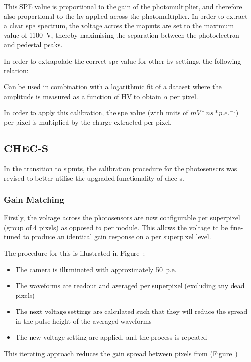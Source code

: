 
This SPE value is proportional to the gain of the photomultiplier, and therefore also proportional to the \gls{hv} applied across the photomultiplier. In order to extract a clear \gls{spe} spectrum, the voltage across the \glspl{mapmt} are set to the maximum value of 1100~V, thereby maximising the separation between the photoelectron and pedestal peaks.

In order to extrapolate the correct \gls{spe} value for other \gls{hv} settings, the following relation:

Can be used in combination with a logarithmic  fit of a dataset where the amplitude is measured as a function of HV to obtain $\alpha$ per pixel. 


In order to apply this calibration, the \gls{spe} value (with units of $mV*ns*p.e.^{-1}$) per pixel is multiplied by the charge extracted per pixel. 

\subsection{CHEC-S}

In the transition to \glspl{sipmt}, the calibration procedure for the photosensors was revised to better utilise the upgraded functionality of \gls{chec-s}. 

\subsubsection{Gain Matching}

Firstly, the voltage across the photosensors are now configurable per superpixel (group of 4 pixels)  as opposed to per module. This allows the voltage to be fine-tuned to produce an identical gain response on a per superpixel level.

The procedure for this is illustrated in Figure~:
\begin{itemize}
	\item The camera is illuminated with approximately 50~p.e.
	\item The waveforms are readout and averaged per superpixel (excluding any dead pixels)
	\item The next voltage settings are calculated such that they will reduce the spread in the pulse height of the averaged waveforms
	\item The new voltage setting are applied, and the process is repeated
\end{itemize}
This iterating approach reduces the gain spread between pixels from  (Figure~)

